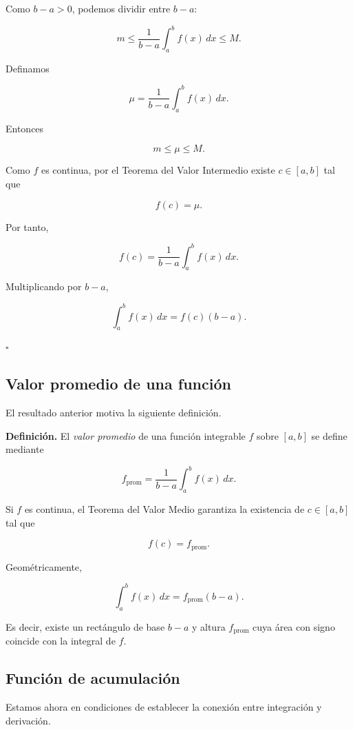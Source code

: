 \documentclass[12pt]{article}
\begin{document}
Como $b-a>0$, podemos dividir entre $b-a$:

\[
m
\leq
\frac{1}{b-a}
\int_a^b f(x)\,dx
\leq
M.
\]

Definamos

\[
\mu
=
\frac{1}{b-a}
\int_a^b f(x)\,dx.
\]

Entonces

\[
m\leq\mu\leq M.
\]

Como $f$ es continua, por el Teorema del Valor Intermedio existe
$c\in[a,b]$ tal que

\[
f(c)=\mu.
\]

Por tanto,

\[
f(c)
=
\frac{1}{b-a}
\int_a^b f(x)\,dx.
\]

Multiplicando por $b-a$,

\[
\boxed{
\int_a^b f(x)\,dx
=
f(c)(b-a).
}
\]

\hfill$\square$

\subsection{Valor promedio de una función}

El resultado anterior motiva la siguiente definición.

\textbf{Definición.}
El \emph{valor promedio} de una función integrable $f$ sobre $[a,b]$ se
define mediante

\[
\boxed{
f_{\mathrm{prom}}
=
\frac{1}{b-a}
\int_a^b f(x)\,dx.
}
\]

Si $f$ es continua, el Teorema del Valor Medio garantiza la existencia de
$c\in[a,b]$ tal que

\[
f(c)=f_{\mathrm{prom}}.
\]

Geométricamente,

\[
\int_a^b f(x)\,dx
=
f_{\mathrm{prom}}(b-a).
\]

Es decir, existe un rectángulo de base $b-a$ y altura
$f_{\mathrm{prom}}$ cuya área con signo coincide con la integral de $f$.

\subsection{Función de acumulación}

Estamos ahora en condiciones de establecer la conexión entre integración
y derivación.
\end{document}
